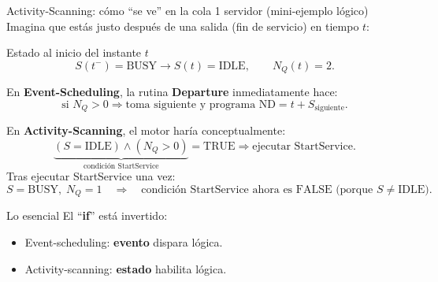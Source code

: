 \documentclass[aspectratio=1610, 9pt]{beamer}
\begin{document}
\begin{frame}{Activity-Scanning: cómo “se ve” en la cola 1 servidor (mini-ejemplo lógico)}
\small
Imagina que estás justo después de una salida (fin de servicio) en tiempo $t$:

\vspace{4pt}
\begin{block}{Estado al inicio del instante $t$}
\[
S(t^-)=\text{BUSY}\to S(t)=\text{IDLE},\qquad N_Q(t)=2.
\]
\end{block}

\vspace{4pt}
En \textbf{Event-Scheduling}, la rutina \textbf{Departure} inmediatamente hace:
\[
\text{si }N_Q>0\Rightarrow \text{toma siguiente y programa ND}=t+S_{\text{siguiente}}.
\]

\vspace{4pt}
En \textbf{Activity-Scanning}, el motor haría conceptualmente:
\[
\underbrace{(S=\text{IDLE})\wedge(N_Q>0)}_{\text{condición StartService}}=\text{TRUE}
\Rightarrow \text{ejecutar StartService}.
\]
Tras ejecutar StartService una vez:
\[
S=\text{BUSY},\; N_Q=1\quad\Rightarrow\quad
\text{condición StartService ahora es FALSE (porque }S\neq\text{IDLE}).
\]

\vspace{4pt}
\begin{alertblock}{Lo esencial}
El “\textbf{if}” está invertido:
\begin{itemize}
\item Event-scheduling: \textbf{evento} dispara lógica.
\item Activity-scanning: \textbf{estado} habilita lógica.
\end{itemize}
\end{alertblock}
\end{frame}
\end{document}
